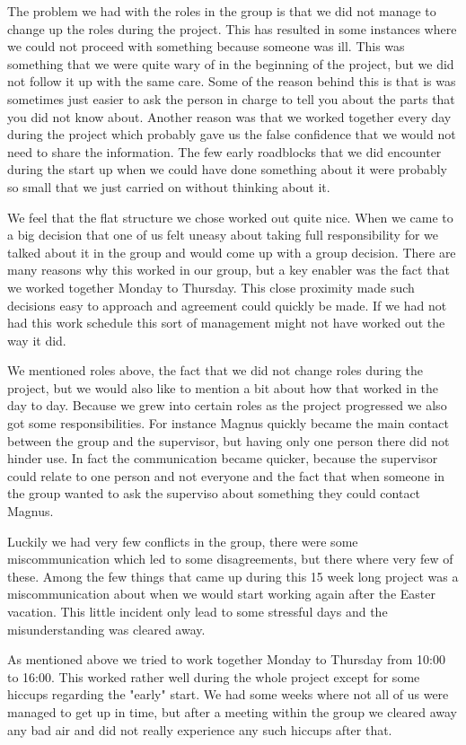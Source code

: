 The problem we had with the roles in the group is that we did not manage to change up the roles during the project. This has resulted in some instances where we could not proceed with something because someone was ill. This was something that we were quite wary of in the beginning of the project, but we did not follow it up with the same care. Some of the reason behind this is that is was sometimes just easier to ask the person in charge to tell you about the parts that you did not know about. Another reason was that we worked together every day during the project which probably gave us the false confidence that we would not need to share the information. The few early roadblocks that we did encounter during the start up when we could have done something about it were probably so small that we just carried on without thinking about it.

We feel that the flat structure we chose worked out quite nice. When we came to a big decision that one of us felt uneasy about taking full responsibility for we talked about it in the group and would come up with a group decision. There are many reasons why this worked in our group, but a key enabler was the fact that we worked together Monday to Thursday. This close proximity made such decisions easy to approach and agreement could quickly be made. If we had not had this work schedule this sort of management might not have worked out the way it did.

We mentioned roles above, the fact that we did not change roles during the project, but we would also like to mention a bit about how that worked in the day to day. Because we grew into certain roles as the project progressed we also got some responsibilities. For instance Magnus quickly became the main contact between the group and the supervisor, but having only one person there did not hinder use. In fact the communication became quicker, because the supervisor could relate to one person and not everyone and the fact that when someone in the group wanted to ask the superviso about something they could contact Magnus.

Luckily we had very few conflicts in the group, there were some miscommunication which led to some disagreements, but there where very few of these. Among the few things that came up during this 15 week long project was a miscommunication about when we would start working again after the Easter vacation. This little incident only lead to some stressful days and the misunderstanding was cleared away.

As mentioned above we tried to work together Monday to Thursday from 10:00 to 16:00. This worked rather well during the whole project except for some hiccups regarding the "early" start. We had some weeks where not all of us were managed to get up in time, but after a meeting within the group we cleared away any bad air and did not really experience any such hiccups after that.
